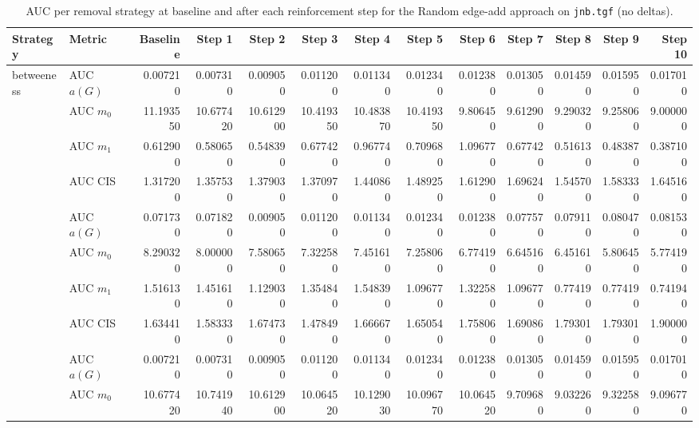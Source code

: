\begin{table}[htbp]
  \centering
  \caption{AUC per removal strategy at baseline and after each reinforcement step for the Random edge-add approach on \texttt{jnb.tgf} (no deltas).}
  \label{tab:jnb-random_add-auc}
\setlength{\tabcolsep}{2.5pt}
  \begin{tabular}{llrrrrrrrrrrr}
    \toprule
    \textbf{Strategy} & \textbf{Metric} & \textbf{Baseline} & \textbf{Step 1} & \textbf{Step 2} & \textbf{Step 3} & \textbf{Step 4} & \textbf{Step 5} & \textbf{Step 6} & \textbf{Step 7} & \textbf{Step 8} & \textbf{Step 9} & \textbf{Step 10} \\
    \midrule
    \multirow{4}{*}{betweeness} & AUC $a(G)$ & 0.007210 & 0.007310 & 0.009050 & 0.011200 & 0.011340 & 0.012340 & 0.012380 & 0.013050 & 0.014590 & 0.015950 & 0.017010 \\
    & AUC $m_0$ & 11.193550 & 10.677420 & 10.612900 & 10.419350 & 10.483870 & 10.419350 & 9.806450 & 9.612900 & 9.290320 & 9.258060 & 9.000000 \\
    & AUC $m_1$ & 0.612900 & 0.580650 & 0.548390 & 0.677420 & 0.967740 & 0.709680 & 1.096770 & 0.677420 & 0.516130 & 0.483870 & 0.387100 \\
    & AUC CIS & 1.317200 & 1.357530 & 1.379030 & 1.370970 & 1.440860 & 1.489250 & 1.612900 & 1.696240 & 1.545700 & 1.583330 & 1.645160 \\
    \addlinespace
    \multirow{4}{*}{closeness} & AUC $a(G)$ & 0.071730 & 0.071820 & 0.009050 & 0.011200 & 0.011340 & 0.012340 & 0.012380 & 0.077570 & 0.079110 & 0.080470 & 0.081530 \\
    & AUC $m_0$ & 8.290320 & 8.000000 & 7.580650 & 7.322580 & 7.451610 & 7.258060 & 6.774190 & 6.645160 & 6.451610 & 5.806450 & 5.774190 \\
    & AUC $m_1$ & 1.516130 & 1.451610 & 1.129030 & 1.354840 & 1.548390 & 1.096770 & 1.322580 & 1.096770 & 0.774190 & 0.774190 & 0.741940 \\
    & AUC CIS & 1.634410 & 1.583330 & 1.674730 & 1.478490 & 1.666670 & 1.650540 & 1.758060 & 1.690860 & 1.793010 & 1.793010 & 1.900000 \\
    \addlinespace
    \multirow{4}{*}{core influence} & AUC $a(G)$ & 0.007210 & 0.007310 & 0.009050 & 0.011200 & 0.011340 & 0.012340 & 0.012380 & 0.013050 & 0.014590 & 0.015950 & 0.017010 \\
    & AUC $m_0$ & 10.677420 & 10.741940 & 10.612900 & 10.064520 & 10.129030 & 10.096770 & 10.064520 & 9.709680 & 9.032260 & 9.322580 & 9.096770 \\

\end{tabular}
\end{table}
